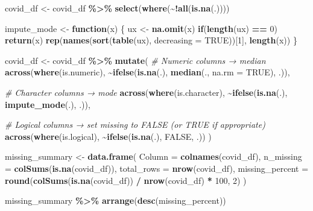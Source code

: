\documentclass[
]{article}
\newenvironment{Shaded}{\begin{snugshade}}{\end{snugshade}}
\newcommand{\AttributeTok}[1]{\textcolor[rgb]{0.13,0.29,0.53}{#1}}
\newcommand{\CommentTok}[1]{\textcolor[rgb]{0.56,0.35,0.01}{\textit{#1}}}
\newcommand{\ConstantTok}[1]{\textcolor[rgb]{0.56,0.35,0.01}{#1}}
\newcommand{\ControlFlowTok}[1]{\textcolor[rgb]{0.13,0.29,0.53}{\textbf{#1}}}
\newcommand{\DecValTok}[1]{\textcolor[rgb]{0.00,0.00,0.81}{#1}}
\newcommand{\FunctionTok}[1]{\textcolor[rgb]{0.13,0.29,0.53}{\textbf{#1}}}
\newcommand{\NormalTok}[1]{#1}
\newcommand{\OtherTok}[1]{\textcolor[rgb]{0.56,0.35,0.01}{#1}}
\newcommand{\SpecialCharTok}[1]{\textcolor[rgb]{0.81,0.36,0.00}{\textbf{#1}}}
\begin{document}
\begin{Shaded}
\begin{Highlighting}[]
\NormalTok{covid\_df }\OtherTok{\textless{}{-}}\NormalTok{ covid\_df }\SpecialCharTok{\%\textgreater{}\%}
  \FunctionTok{select}\NormalTok{(}\FunctionTok{where}\NormalTok{(}\SpecialCharTok{\textasciitilde{}!}\FunctionTok{all}\NormalTok{(}\FunctionTok{is.na}\NormalTok{(.))))}


\NormalTok{impute\_mode }\OtherTok{\textless{}{-}} \ControlFlowTok{function}\NormalTok{(x) \{}
\NormalTok{  ux }\OtherTok{\textless{}{-}} \FunctionTok{na.omit}\NormalTok{(x)}
  \ControlFlowTok{if}\NormalTok{(}\FunctionTok{length}\NormalTok{(ux) }\SpecialCharTok{==} \DecValTok{0}\NormalTok{) }\FunctionTok{return}\NormalTok{(x)}
  \FunctionTok{rep}\NormalTok{(}\FunctionTok{names}\NormalTok{(}\FunctionTok{sort}\NormalTok{(}\FunctionTok{table}\NormalTok{(ux), }\AttributeTok{decreasing =} \ConstantTok{TRUE}\NormalTok{))[}\DecValTok{1}\NormalTok{], }\FunctionTok{length}\NormalTok{(x))}
\NormalTok{\}}


\NormalTok{covid\_df }\OtherTok{\textless{}{-}}\NormalTok{ covid\_df }\SpecialCharTok{\%\textgreater{}\%}
  \FunctionTok{mutate}\NormalTok{(}
    \CommentTok{\# Numeric columns → median}
    \FunctionTok{across}\NormalTok{(}\FunctionTok{where}\NormalTok{(is.numeric), }\SpecialCharTok{\textasciitilde{}}\FunctionTok{ifelse}\NormalTok{(}\FunctionTok{is.na}\NormalTok{(.), }\FunctionTok{median}\NormalTok{(., }\AttributeTok{na.rm =} \ConstantTok{TRUE}\NormalTok{), .)),}
    
    \CommentTok{\# Character columns → mode}
    \FunctionTok{across}\NormalTok{(}\FunctionTok{where}\NormalTok{(is.character), }\SpecialCharTok{\textasciitilde{}}\FunctionTok{ifelse}\NormalTok{(}\FunctionTok{is.na}\NormalTok{(.), }\FunctionTok{impute\_mode}\NormalTok{(.), .)),}
    
    \CommentTok{\# Logical columns → set missing to FALSE (or TRUE if appropriate)}
    \FunctionTok{across}\NormalTok{(}\FunctionTok{where}\NormalTok{(is.logical), }\SpecialCharTok{\textasciitilde{}}\FunctionTok{ifelse}\NormalTok{(}\FunctionTok{is.na}\NormalTok{(.), }\ConstantTok{FALSE}\NormalTok{, .))}
\NormalTok{  )}


\NormalTok{missing\_summary }\OtherTok{\textless{}{-}} \FunctionTok{data.frame}\NormalTok{(}
  \AttributeTok{Column =} \FunctionTok{colnames}\NormalTok{(covid\_df),}
  \AttributeTok{n\_missing =} \FunctionTok{colSums}\NormalTok{(}\FunctionTok{is.na}\NormalTok{(covid\_df)),}
  \AttributeTok{total\_rows =} \FunctionTok{nrow}\NormalTok{(covid\_df),}
  \AttributeTok{missing\_percent =} \FunctionTok{round}\NormalTok{(}\FunctionTok{colSums}\NormalTok{(}\FunctionTok{is.na}\NormalTok{(covid\_df)) }\SpecialCharTok{/} \FunctionTok{nrow}\NormalTok{(covid\_df) }\SpecialCharTok{*} \DecValTok{100}\NormalTok{, }\DecValTok{2}\NormalTok{)}
\NormalTok{)}

\NormalTok{missing\_summary }\SpecialCharTok{\%\textgreater{}\%} \FunctionTok{arrange}\NormalTok{(}\FunctionTok{desc}\NormalTok{(missing\_percent))}
\end{Highlighting}
\end{Shaded}
\end{document}
